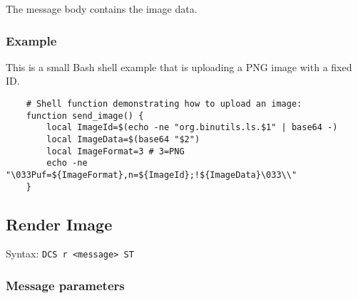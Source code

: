 \documentclass[a4paper]{article}
\newcommand{\code}[1]{\colorbox{light-gray}{\texttt{#1}}}
\begin{document}
The message body contains the image data.

\subsubsection*{Example}

This is a small Bash shell example that is uploading a PNG image with a fixed ID.

\begin{verbatim}
    # Shell function demonstrating how to upload an image:
    function send_image() {
        local ImageId=$(echo -ne "org.binutils.ls.$1" | base64 -)
        local ImageData=$(base64 "$2")
        local ImageFormat=3 # 3=PNG
        echo -ne "\033Puf=${ImageFormat},n=${ImageId};!${ImageData}\033\\"
    }
\end{verbatim}

\pagebreak

\subsection{Render Image}

Syntax: \code{DCS r <message> ST}

\subsubsection*{Message parameters}
\end{document}

